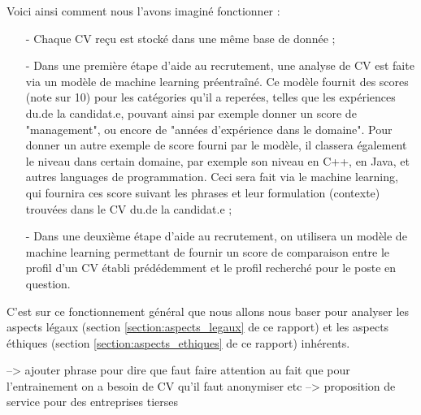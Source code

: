 Voici ainsi comment nous l'avons imaginé fonctionner : 

\begin{enumerate}
    \item[-] Chaque CV reçu est stocké dans une même base de donnée ;
    \item[-] Dans une première étape d'aide au recrutement, une analyse de CV est faite via un modèle de machine learning préentraîné. Ce modèle fournit des scores (note sur 10) pour les catégories qu'il a reperées, telles que les expériences du.de la candidat.e, pouvant ainsi par exemple donner un score de "management", ou encore de "années d'expérience dans le domaine". Pour donner un autre exemple de score fourni par le modèle, il classera également le niveau dans certain domaine, par exemple son niveau en C++, en Java, et autres languages de programmation. Ceci sera fait via le machine learning, qui fournira ces score suivant les phrases et leur formulation (contexte) trouvées dans le CV du.de la candidat.e ;
    \item[-] Dans une deuxième étape d'aide au recrutement, on utilisera un modèle de machine learning permettant de fournir un score de comparaison entre le profil d'un CV établi prédédemment et le profil recherché pour le poste en question.
\end{enumerate}

C'est sur ce fonctionnement général que nous allons nous baser pour analyser les aspects légaux (section \ref{section:aspects_legaux} de ce rapport) et les aspects éthiques (section \ref{section:aspects_ethiques} de ce rapport) inhérents.

--> ajouter phrase pour dire que faut faire attention au fait que pour l'entrainement on a besoin de CV qu'il faut anonymiser etc
--> proposition de service pour des entreprises tierses
